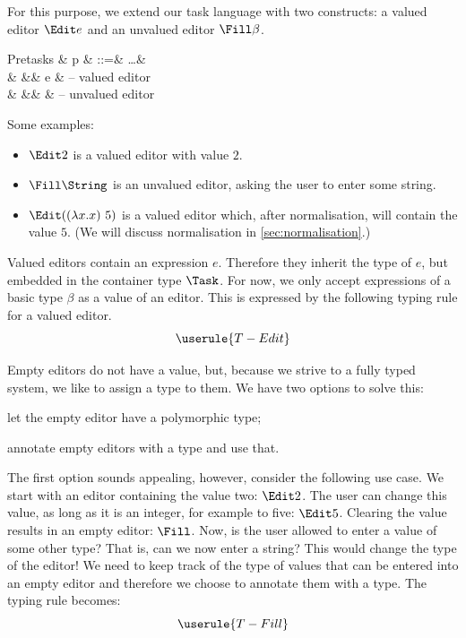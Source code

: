 For this purpose, we extend our task language with two constructs:
a valued editor $\Edit e$ and an unvalued editor $\Fill \beta$.
\begin{grammar}
  Pretasks
    & p & ::=& \ldots      & \\
    &   &\mid& \Edit e     & – valued editor \\
    &   &\mid& \Fill \tau  & – unvalued editor \\
\end{grammar}
Some examples:
\begin{itemize}
  \item $\Edit 2$ is a valued editor with value $2$.
  \item $\Fill \String$ is an unvalued editor,
    asking the user to enter some string.
  \item $\Edit ((\lambda x . x)\ 5)$ is a valued editor which,
    after normalisation, will contain the value $5$.
    (We will discuss normalisation in \autoref{sec:normalisation}.)
\end{itemize}

Valued editors contain an expression $e$.
Therefore they inherit the type of $e$,
but embedded in the container type $\Task$.
For now, we only accept expressions of a basic type $\beta$ as a value of an editor.
This is expressed by the following typing rule for a valued editor.
\begin{equation*}
  \userule{T-Edit}
\end{equation*}

Empty editors do not have a value,
but, because we strive to a fully typed system,
we like to assign a type to them.
We have two options to solve this:
\begin{enumerate*}
  \item let the empty editor have a polymorphic type;
  \item annotate empty editors with a type and use that.
\end{enumerate*}
The first option sounds appealing, however, consider the following use case.
We start with an editor containing the value two: $\Edit 2$.
The user can change this value, as long as it is an integer,
for example to five: $\Edit 5$.
Clearing the value results in an empty editor: $\Fill$.
Now, is the user allowed to enter a value of some other type?
That is, can we now enter a string?
This would change the type of the editor!
We need to keep track of the type of values that can be entered into an empty editor
and therefore we choose to annotate them with a type.
The typing rule becomes:
\begin{equation*}
  \userule{T-Fill}
\end{equation*}


